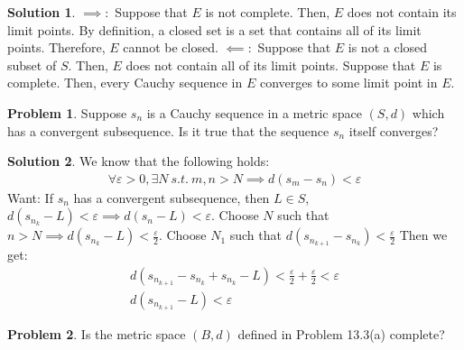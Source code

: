 \documentclass[12pt]{article}
\theoremstyle{definition} %
\newtheorem{solution}{Solution}
\newtheorem{problem}{Problem}
\theoremstyle{plain} %
\begin{document}
\begin{solution}
    $\implies :$ Suppose that $E$ is not complete. Then, $E$ does not contain its limit points. By definition, a closed set is a set that contains all of its limit points. Therefore, $E$ cannot be closed.
    $\impliedby :$ Suppose that $E$ is not a closed subset of $S$. Then, $E$ does not contain all of its limit points. Suppose that $E$ is complete. Then, every Cauchy sequence in $E$ converges to some limit point in $E$.
\end{solution}
\begin{problem}
    Suppose $s_{n} $ is a Cauchy sequence in a metric space $(S,d)$ which has a convergent subsequence. Is it true that the sequence $s_{n} $ itself converges?
\end{problem}

\begin{solution}
   We know that the following holds:
   \begin{align}
    \forall \varepsilon >0, \exists N\ s.t. \ m,n>N\implies d(s_{m} -s_{n} )<\varepsilon 
   \end{align} 
   Want: If $s_{n} $ has a convergent subsequence, then $L\in S$, $d(s_{n_{k} }-L )<\varepsilon\implies d(s_{n} -L)<\varepsilon  $.
   Choose $N$ such that $n>N\implies d(s_{n_{k}  } -L)<\frac{\varepsilon}{2}$.
   Choose $N_{1} $ such that $d(s_{n_{k+1} }-s_{n_{k} }  )<\frac{\varepsilon}{2}$  
   Then we get:
   \begin{align}
    d(s_{n_{k+1} }-s_{n_{k} }+s_{n_{k} }-L   )<\frac{\varepsilon}{2}+\frac{\varepsilon}{2}<\varepsilon \\[10pt] 
    d(s_{n_{k+1} }-L )<\varepsilon 
   \end{align}
\end{solution}

\begin{problem}
    Is the metric space $(B,d)$ defined in Problem 13.3(a) complete?
\end{problem}
\end{document}
